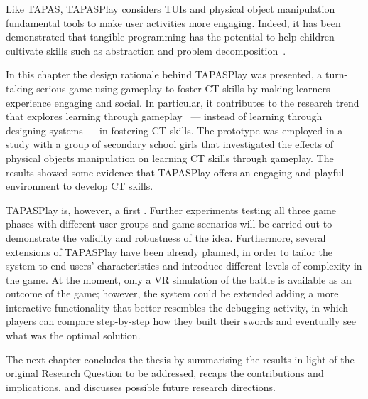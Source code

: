Like \ac{TAPAS}, TAPASPlay considers \acp{TUI} and physical object manipulation fundamental tools to make user activities more engaging. Indeed, it has been demonstrated that tangible programming has the potential to help children cultivate skills such as abstraction and problem decomposition~\cite{Wang:2014jy}.

In this chapter the design rationale behind TAPASPlay was presented, a turn-taking serious game using gameplay to foster \ac{CT} skills by making learners experience engaging and social. In particular, it contributes to the research trend that explores learning through gameplay~\cite{Kazimoglu:2012ft} --- instead of learning through designing systems --- in fostering \ac{CT} skills. The prototype was employed in a study with a group of secondary school girls that investigated the effects of physical objects manipulation on learning \ac{CT} skills through gameplay. The results showed some evidence that TAPASPlay offers an engaging and playful environment to develop \ac{CT} skills.

TAPASPlay is, however, a first . Further experiments testing all three game phases with different user groups and game scenarios will be carried out to demonstrate the validity and robustness of the idea. Furthermore, several extensions of TAPASPlay have been already planned, in order to tailor the system to end-users' characteristics and introduce different levels of complexity in the game. At the moment, only a \ac{VR} simulation of the battle is available as an outcome of the game; however, the system could be extended adding a more interactive functionality that better resembles the debugging activity, in which players can compare step-by-step how they built their swords and eventually see what was the optimal solution.

The next chapter concludes the thesis by summarising the results in light of the original Research Question to be addressed, recaps the contributions and implications, and discusses possible future research directions.